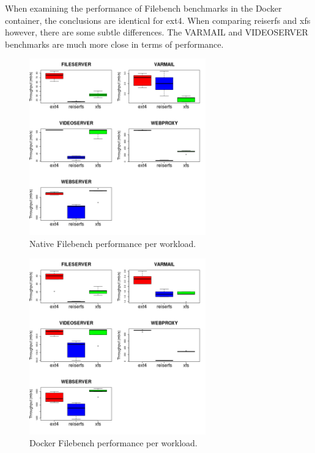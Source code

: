 \documentclass[letterpaper,twocolumn,10pt]{article}
\begin{document}
When examining the performance of Filebench benchmarks in the Docker container, the conclusions are identical for ext4. When comparing reiserfs and xfs however, there are some subtle differences. The VARMAIL and VIDEOSERVER benchmarks are much more close in terms of performance.


\begin{figure}[!ht]
\centering
\includegraphics[width=3in]{../results/arch_workload_boxplots.png}
\caption{Native Filebench performance per workload.}
\label{fig:arch_workload_boxplots}
\end{figure}

\begin{figure}[!ht]
\centering
\includegraphics[width=3in]{../results/dock_workload_boxplots.png}
\caption{Docker Filebench performance per workload.}
\label{fig:dock_workload_boxplots}
\end{figure}
\end{document}
